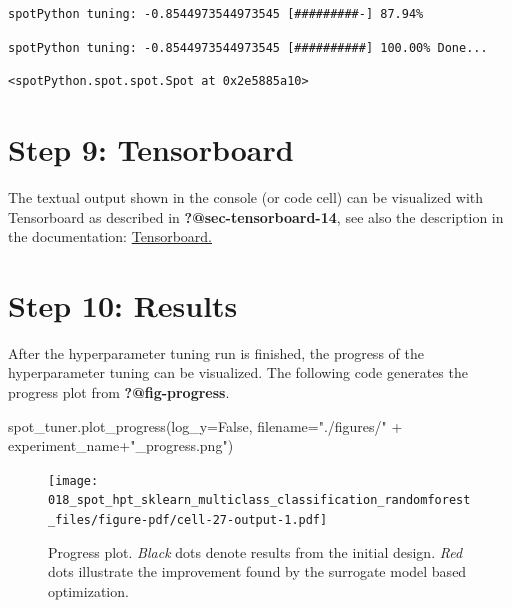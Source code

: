 \documentclass[
  letterpaper,
  DIV=11,
  numbers=noendperiod]{scrreprt}
\newenvironment{Shaded}{\begin{snugshade}}{\end{snugshade}}
\newcommand{\NormalTok}[1]{\textcolor[rgb]{0.00,0.23,0.31}{#1}}
\newcommand{\OperatorTok}[1]{\textcolor[rgb]{0.37,0.37,0.37}{#1}}
\newcommand{\StringTok}[1]{\textcolor[rgb]{0.13,0.47,0.30}{#1}}
\newcommand{\VariableTok}[1]{\textcolor[rgb]{0.07,0.07,0.07}{#1}}
\begin{document}
\begin{verbatim}
spotPython tuning: -0.8544973544973545 [#########-] 87.94% 
\end{verbatim}

\begin{verbatim}
spotPython tuning: -0.8544973544973545 [##########] 100.00% Done...
\end{verbatim}

\begin{verbatim}
<spotPython.spot.spot.Spot at 0x2e5885a10>
\end{verbatim}

\hypertarget{sec-tensorboard-16}{%
\section{Step 9: Tensorboard}\label{sec-tensorboard-16}}

The textual output shown in the console (or code cell) can be visualized
with Tensorboard as described in \textbf{?@sec-tensorboard-14}, see also
the description in the documentation:
\href{https://sequential-parameter-optimization.github.io/spotPython/14_spot_ray_hpt_torch_cifar10.html\#sec-tensorboard-14}{Tensorboard.}

\hypertarget{sec-results-tuning-16}{%
\section{Step 10: Results}\label{sec-results-tuning-16}}

After the hyperparameter tuning run is finished, the progress of the
hyperparameter tuning can be visualized. The following code generates
the progress plot from \textbf{?@fig-progress}.

\begin{Shaded}
\begin{Highlighting}[]
\NormalTok{spot\_tuner.plot\_progress(log\_y}\OperatorTok{=}\VariableTok{False}\NormalTok{,}
\NormalTok{    filename}\OperatorTok{=}\StringTok{"./figures/"} \OperatorTok{+}\NormalTok{ experiment\_name}\OperatorTok{+}\StringTok{"\_progress.png"}\NormalTok{)}
\end{Highlighting}
\end{Shaded}

\begin{figure}[H]

{\centering \texttt{[image: 018\_spot\_hpt\_sklearn\_multiclass\_classification\_randomforest\_files/figure-pdf/cell-27-output-1.pdf]}

}

\caption{Progress plot. \emph{Black} dots denote results from the
initial design. \emph{Red} dots illustrate the improvement found by the
surrogate model based optimization.}

\end{figure}
\end{document}
